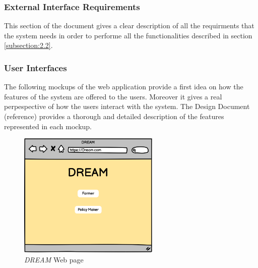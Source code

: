 \subsubsection{External Interface Requirements}
This section of the document gives a clear description of all the requirments that the system needs in order to performe all 
the functionalities described in section \ref{subsection:2.2}.

\subsubsection{User Interfaces}
The following mockups of the web application provide a first idea on how the features of the system are offered to the users. 
Moreover it gives a real perpespective of how the users interact with the system. 
The Design Document (reference) provides a thorough and detailed description of the features represented in each mockup.

\begin{figure}[H]
    \begin{center}
    \includegraphics[width=0.6\textwidth]{mockups/Dream.png}
    \caption{\emph{DREAM} Web page}
    \label{fig:webPage}
    \end{center}
\end{figure}
 

